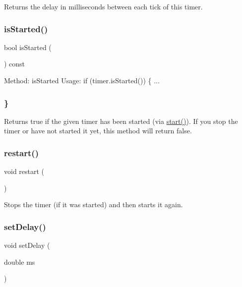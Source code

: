 Returns the delay in milliseconds between each tick of this timer. 

\mbox{\label{classsgl_1_1GTimer_ac1991ea0e286fbb461b60c8c9299d781}} 
\subsubsection{\texorpdfstring{is\+Started()}{isStarted()}}
{\footnotesize\ttfamily bool is\+Started (\begin{DoxyParamCaption}{ }\end{DoxyParamCaption}) const}



Method\+: is\+Started Usage\+: if (timer.\+is\+Started()) \{ ... 

\subsubsection*{\} }

Returns true if the given timer has been started (via \mbox{\hyperlink{classsgl_1_1GTimer_a60de64d75454385b23995437f1d72669}{start()}}). If you stop the timer or have not started it yet, this method will return false. \mbox{\label{classsgl_1_1GTimer_a22ee094ca3f45aa4156b97d34fe678bf}} 
\subsubsection{\texorpdfstring{restart()}{restart()}}
{\footnotesize\ttfamily void restart (\begin{DoxyParamCaption}{ }\end{DoxyParamCaption})}



Stops the timer (if it was started) and then starts it again. 

\mbox{\label{classsgl_1_1GTimer_acebfcbc48c6acd460dac117a8f71a92f}} 
\subsubsection{\texorpdfstring{set\+Delay()}{setDelay()}}
{\footnotesize\ttfamily void set\+Delay (\begin{DoxyParamCaption}\item[{double}]{ms }\end{DoxyParamCaption})}



